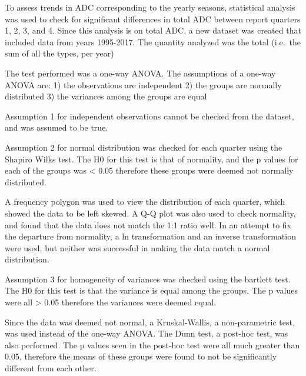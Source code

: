 \documentclass[12pt,]{article}
\newenvironment{Shaded}{\begin{snugshade}}{\end{snugshade}}
\newcommand{\KeywordTok}[1]{\textcolor[rgb]{0.13,0.29,0.53}{\textbf{#1}}}
\newcommand{\StringTok}[1]{\textcolor[rgb]{0.31,0.60,0.02}{#1}}
\newcommand{\CommentTok}[1]{\textcolor[rgb]{0.56,0.35,0.01}{\textit{#1}}}
\newcommand{\OperatorTok}[1]{\textcolor[rgb]{0.81,0.36,0.00}{\textbf{#1}}}
\newcommand{\NormalTok}[1]{#1}
\begin{document}
To assess trends in ADC corresponding to the yearly seasons, statistical
analysis was used to check for significant differences in total ADC
between report quarters 1, 2, 3, and 4. Since this analysis is on total
ADC, a new dataset was created that included data from years 1995-2017.
The quantity analyzed was the total (i.e.~the sum of all the types, per
year)

The test performed was a one-way ANOVA. The assumptions of a one-way
ANOVA are: 1) the observations are independent 2) the groups are
normally distributed 3) the variances among the groups are equal

Assumption 1 for independent observations cannot be checked from the
dataset, and was assumed to be true.

Assumption 2 for normal distribution was checked for each quarter using
the Shapiro Wilks test. The H0 for this test is that of normality, and
the p values for each of the groups was \textless{} 0.05 therefore these
groups were deemed not normally distributed.

A frequency polygon was used to view the distribution of each quarter,
which showed the data to be left skewed. A Q-Q plot was also used to
check normality, and found that the data does not match the 1:1 ratio
well. In an attempt to fix the departure from normality, a ln
transformation and an inverse transformation were used, but neither was
successful in making the data match a normal distribution.

Assumption 3 for homogeneity of variances was checked using the bartlett
test. The H0 for this test is that the variance is equal among the
groups. The p values were all \textgreater{} 0.05 therefore the
variances were deemed equal.

Since the data was deemed not normal, a Kruskal-Wallis, a non-parametric
test, was used instead of the one-way ANOVA. The Dunn test, a post-hoc
test, was also performed. The p values seen in the post-hoc test were
all much greater than 0.05, therefore the means of these groups were
found to not be significantly different from each other.

\begin{Shaded}
\end{Shaded}
\end{document}
